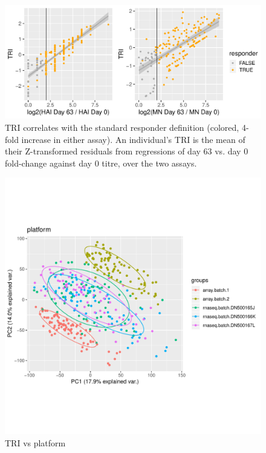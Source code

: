 \begin{figure}
    \includegraphics[width=1.0\textwidth]{mainmatter/figures/chapter_02/phenotype_data_setup.tri_comparison_ASHG.pdf}
    \caption{TRI correlates with the standard responder definition (colored, 4-fold increase in either assay). An individual's TRI is the mean of their Z-transformed residuals from regressions of day 63 vs. day 0 fold-change against day 0 titre, over the two assays.}
    \label{fig:tri_vs_responder}
\end{figure}

\begin{figure}
    \includegraphics[width=1.0\textwidth,page=2]{mainmatter/figures/chapter_02/compare_phenotype_by_platform.plots.pdf}
    \caption{TRI vs platform}
    \label{fig:tri_by_platform}
\end{figure}

